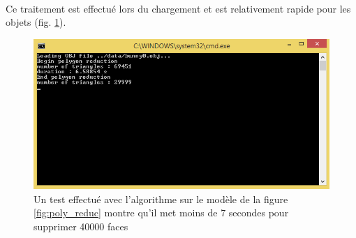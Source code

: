 \paragraph{}
Ce traitement est effectué lors du chargement et est relativement rapide pour les objets (fig. \ref{fig:poly_reduc_console}).
\begin{figure}[h]
		\centering
		\includegraphics[scale=0.4]{polygon_reduction_console.png}
		\caption{\label{fig:poly_reduc_console}Un test effectué avec l'algorithme sur le modèle de la figure \ref{fig:poly_reduc} montre qu'il met moins de 7 secondes pour supprimer 40000 faces}
\end{figure}